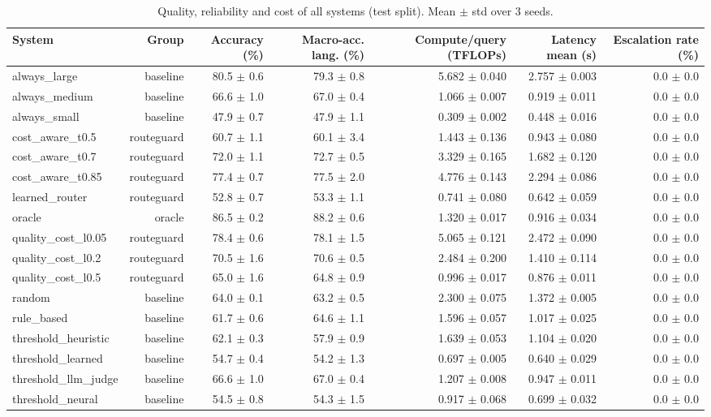 \begin{table}[t]
\centering
\small
\caption{Quality, reliability and cost of all systems (test split). Mean $\pm$ std over 3 seeds.}
\label{tab:main_results}
\begin{tabular}{lrrrrrr}
\toprule
System & Group & Accuracy (\%) & Macro-acc. lang. (\%) & Compute/query (TFLOPs) & Latency mean (s) & Escalation rate (\%) \\
\midrule
always\_large & baseline & 80.5 $\pm$ 0.6 & 79.3 $\pm$ 0.8 & 5.682 $\pm$ 0.040 & 2.757 $\pm$ 0.003 & 0.0 $\pm$ 0.0 \\
always\_medium & baseline & 66.6 $\pm$ 1.0 & 67.0 $\pm$ 0.4 & 1.066 $\pm$ 0.007 & 0.919 $\pm$ 0.011 & 0.0 $\pm$ 0.0 \\
always\_small & baseline & 47.9 $\pm$ 0.7 & 47.9 $\pm$ 1.1 & 0.309 $\pm$ 0.002 & 0.448 $\pm$ 0.016 & 0.0 $\pm$ 0.0 \\
cost\_aware\_t0.5 & routeguard & 60.7 $\pm$ 1.1 & 60.1 $\pm$ 3.4 & 1.443 $\pm$ 0.136 & 0.943 $\pm$ 0.080 & 0.0 $\pm$ 0.0 \\
cost\_aware\_t0.7 & routeguard & 72.0 $\pm$ 1.1 & 72.7 $\pm$ 0.5 & 3.329 $\pm$ 0.165 & 1.682 $\pm$ 0.120 & 0.0 $\pm$ 0.0 \\
cost\_aware\_t0.85 & routeguard & 77.4 $\pm$ 0.7 & 77.5 $\pm$ 2.0 & 4.776 $\pm$ 0.143 & 2.294 $\pm$ 0.086 & 0.0 $\pm$ 0.0 \\
learned\_router & routeguard & 52.8 $\pm$ 0.7 & 53.3 $\pm$ 1.1 & 0.741 $\pm$ 0.080 & 0.642 $\pm$ 0.059 & 0.0 $\pm$ 0.0 \\
oracle & oracle & 86.5 $\pm$ 0.2 & 88.2 $\pm$ 0.6 & 1.320 $\pm$ 0.017 & 0.916 $\pm$ 0.034 & 0.0 $\pm$ 0.0 \\
quality\_cost\_l0.05 & routeguard & 78.4 $\pm$ 0.6 & 78.1 $\pm$ 1.5 & 5.065 $\pm$ 0.121 & 2.472 $\pm$ 0.090 & 0.0 $\pm$ 0.0 \\
quality\_cost\_l0.2 & routeguard & 70.5 $\pm$ 1.6 & 70.6 $\pm$ 0.5 & 2.484 $\pm$ 0.200 & 1.410 $\pm$ 0.114 & 0.0 $\pm$ 0.0 \\
quality\_cost\_l0.5 & routeguard & 65.0 $\pm$ 1.6 & 64.8 $\pm$ 0.9 & 0.996 $\pm$ 0.017 & 0.876 $\pm$ 0.011 & 0.0 $\pm$ 0.0 \\
random & baseline & 64.0 $\pm$ 0.1 & 63.2 $\pm$ 0.5 & 2.300 $\pm$ 0.075 & 1.372 $\pm$ 0.005 & 0.0 $\pm$ 0.0 \\
rule\_based & baseline & 61.7 $\pm$ 0.6 & 64.6 $\pm$ 1.1 & 1.596 $\pm$ 0.057 & 1.017 $\pm$ 0.025 & 0.0 $\pm$ 0.0 \\
threshold\_heuristic & baseline & 62.1 $\pm$ 0.3 & 57.9 $\pm$ 0.9 & 1.639 $\pm$ 0.053 & 1.104 $\pm$ 0.020 & 0.0 $\pm$ 0.0 \\
threshold\_learned & baseline & 54.7 $\pm$ 0.4 & 54.2 $\pm$ 1.3 & 0.697 $\pm$ 0.005 & 0.640 $\pm$ 0.029 & 0.0 $\pm$ 0.0 \\
threshold\_llm\_judge & baseline & 66.6 $\pm$ 1.0 & 67.0 $\pm$ 0.4 & 1.207 $\pm$ 0.008 & 0.947 $\pm$ 0.011 & 0.0 $\pm$ 0.0 \\
threshold\_neural & baseline & 54.5 $\pm$ 0.8 & 54.3 $\pm$ 1.5 & 0.917 $\pm$ 0.068 & 0.699 $\pm$ 0.032 & 0.0 $\pm$ 0.0 \\
\bottomrule
\end{tabular}
\end{table}
